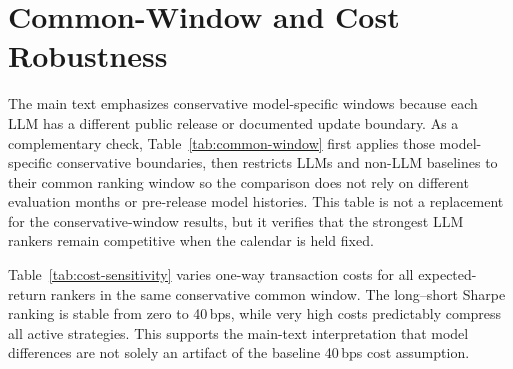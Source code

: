 \section{Common-Window and Cost Robustness}
\label{app:common-window}

The main text emphasizes conservative model-specific windows because each LLM has a different public release or documented update boundary.
As a complementary check, Table~\ref{tab:common-window} first applies those model-specific conservative boundaries, then restricts LLMs and non-LLM baselines to their common ranking window so the comparison does not rely on different evaluation months or pre-release model histories.
This table is not a replacement for the conservative-window results, but it verifies that the strongest LLM rankers remain competitive when the calendar is held fixed.



Table~\ref{tab:cost-sensitivity} varies one-way transaction costs for all expected-return rankers in the same conservative common window.
The long--short Sharpe ranking is stable from zero to 40\,bps, while very high costs predictably compress all active strategies.
This supports the main-text interpretation that model differences are not solely an artifact of the baseline 40\,bps cost assumption.



\clearpage
